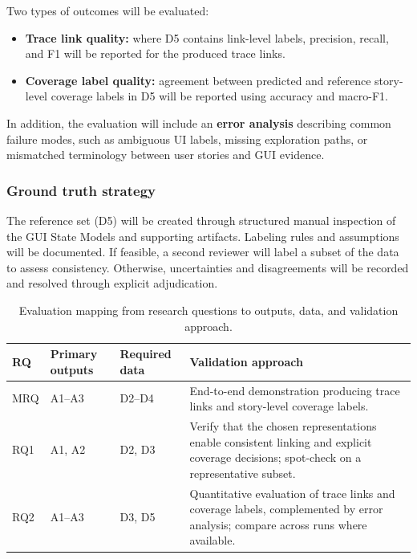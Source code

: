 Two types of outcomes will be evaluated:

\begin{itemize}
    \item \textbf{Trace link quality:}
    where D5 contains link-level labels, precision, recall, and F1 will be reported for the produced trace links.

    \item \textbf{Coverage label quality:}
    agreement between predicted and reference story-level coverage labels in D5 will be reported using accuracy and macro-F1.
\end{itemize}

In addition, the evaluation will include an \textbf{error analysis} describing common failure modes, such as ambiguous UI labels, missing exploration paths, or mismatched terminology between user stories and GUI evidence.

\subsubsection{Ground truth strategy}

The reference set (D5) will be created through structured manual inspection of the GUI State Models and supporting artifacts. Labeling rules and assumptions will be documented. If feasible, a second reviewer will label a subset of the data to assess consistency. Otherwise, uncertainties and disagreements will be recorded and resolved through explicit adjudication.

\begin{table}[h!tb]
    \centering
    \caption{Evaluation mapping from research questions to outputs, data, and validation approach.}
    \label{tab:rq-validation-mapping}
    \begin{tabular}{p{1.6cm}p{4.0cm}p{4.2cm}p{5.0cm}}
        \toprule
        \textbf{RQ} & \textbf{Primary outputs} & \textbf{Required data} & \textbf{Validation approach} \\
        \midrule
        MRQ & A1--A3 & D2--D4 & End-to-end demonstration producing trace links and story-level coverage labels. \\
        RQ1 & A1, A2 & D2, D3 & Verify that the chosen representations enable consistent linking and explicit coverage decisions; spot-check on a representative subset. \\
        RQ2 & A1--A3 & D3, D5 & Quantitative evaluation of trace links and coverage labels, complemented by error analysis; compare across runs where available. \\
        \bottomrule
    \end{tabular}
\end{table}

